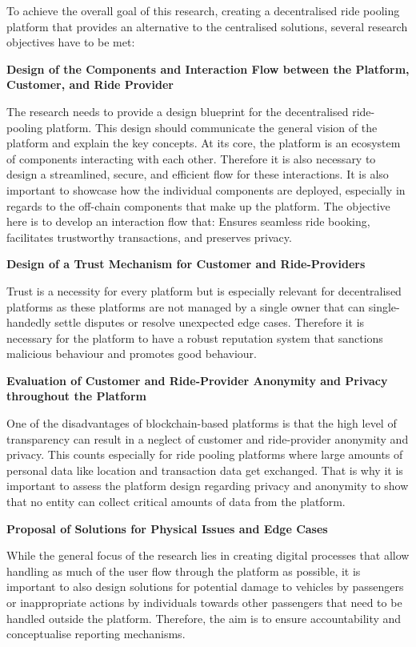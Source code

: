 To achieve the overall goal of this research, creating a decentralised ride pooling platform that provides an alternative to the centralised solutions, several research objectives have to be met:

\textbf{Design of the Components and Interaction Flow between the Platform, Customer, and Ride Provider}

The research needs to provide a design blueprint for the decentralised ride-pooling platform. This design should communicate the general vision of the platform and explain the key concepts.
At its core, the platform is an ecosystem of components interacting with each other. 
Therefore it is also necessary to design a streamlined, secure, and efficient flow for these interactions. It is also important to showcase how the individual components are deployed, especially in regards to the off-chain components that make up the platform. The objective here is to develop an interaction flow that: Ensures seamless ride booking, facilitates trustworthy transactions, and preserves privacy.


\textbf{Design of a Trust Mechanism for Customer and Ride-Providers}

Trust is a necessity for every platform but is especially relevant for decentralised platforms as these platforms are not managed by a single owner that can single-handedly  settle disputes or resolve unexpected edge cases. Therefore it is necessary for the platform to have a robust reputation system that sanctions malicious behaviour and promotes  good behaviour.


\textbf{Evaluation of Customer and Ride-Provider Anonymity and Privacy throughout the Platform}

One of the disadvantages of blockchain-based platforms is that the high level of transparency can result in a neglect of customer and ride-provider anonymity and privacy. This counts especially for ride pooling platforms where large amounts of personal data like location and transaction data get exchanged. That is why it is important to assess the platform design regarding privacy and anonymity to show that no entity can collect critical amounts of data from the platform.


\textbf{Proposal of Solutions for Physical Issues and Edge Cases}

While the general focus of the research lies in creating digital processes that allow handling as much of the user flow through the platform as possible, it is important to also design solutions for  potential damage to vehicles by passengers or inappropriate actions by individuals towards other passengers that need to be handled outside the platform. Therefore, the aim is to ensure accountability and conceptualise reporting mechanisms.


